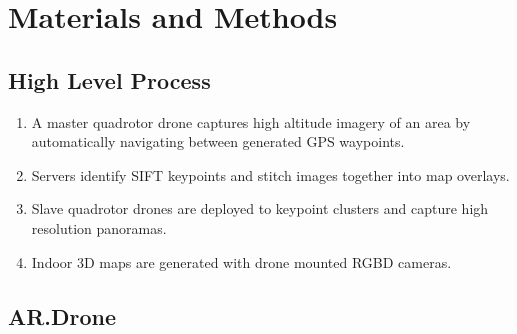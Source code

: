 
\section{Materials and Methods}				%


\subsection{High Level Process}
\vspace{1ex}
\begin{onehalfspacing}
	\begin{enumerate}
		\item A master quadrotor drone captures high altitude imagery of an area by automatically navigating between generated GPS waypoints.
		\item Servers identify SIFT keypoints and stitch images together into map overlays.
		\item Slave quadrotor drones are deployed to keypoint clusters and capture high resolution panoramas.
		\item Indoor 3D maps are generated with drone mounted RGBD cameras.
	\end{enumerate}
\end{onehalfspacing}

\subsection{AR.Drone}

